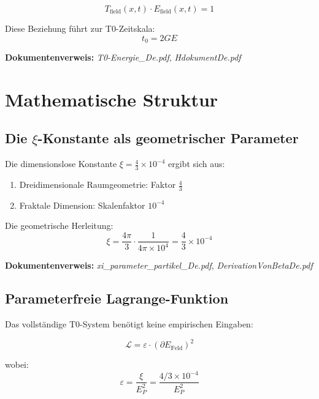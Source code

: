 \documentclass[12pt,a4paper]{article}
\newcommand{\xipar}{\xi}
\newcommand{\Efield}{E_{\text{Feld}}}
\begin{document}
	\begin{equation}
		T_{\text{field}}(x,t) \cdot E_{\text{field}}(x,t) = 1
	\end{equation}
	
	Diese Beziehung führt zur T0-Zeitskala:
	\begin{equation}
		t_0 = 2GE
	\end{equation}
	
	\textbf{Dokumentenverweis:} \textit{T0-Energie\_De.pdf}, \textit{HdokumentDe.pdf}
	
	\section{Mathematische Struktur}
	
	\subsection{Die $\xipar$-Konstante als geometrischer Parameter}
	
	Die dimensionslose Konstante $\xipar = \frac{4}{3} \times 10^{-4}$ ergibt sich aus:
	
	\begin{enumerate}
		\item Dreidimensionale Raumgeometrie: Faktor $\frac{4}{3}$
		\item Fraktale Dimension: Skalenfaktor $10^{-4}$
	\end{enumerate}
	
	Die geometrische Herleitung:
	\begin{equation}
		\xipar = \frac{4\pi}{3} \cdot \frac{1}{4\pi \times 10^4} = \frac{4}{3} \times 10^{-4}
	\end{equation}
	
	\textbf{Dokumentenverweis:} \textit{xi\_parameter\_partikel\_De.pdf}, \textit{DerivationVonBetaDe.pdf}
	
	\subsection{Parameterfreie Lagrange-Funktion}
	
	Das vollständige T0-System benötigt keine empirischen Eingaben:
	
	\begin{equation}
		\mathcal{L} = \varepsilon \cdot (\partial \Efield)^2
	\end{equation}
	
	wobei:
	\begin{equation}
		\varepsilon = \frac{\xipar}{E_P^2} = \frac{4/3 \times 10^{-4}}{E_P^2}
	\end{equation}
	
\end{document}
